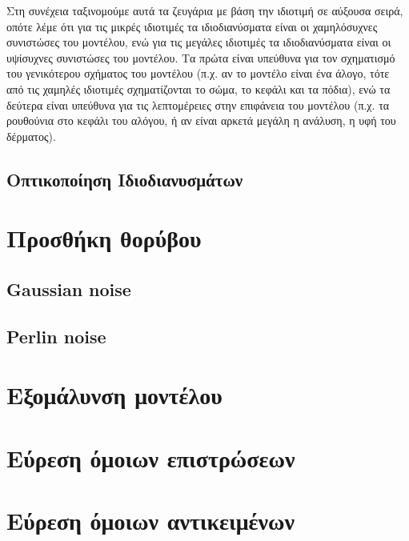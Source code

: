 \documentclass{article}
\begin{document}
Στη συνέχεια ταξινομούμε αυτά τα ζευγάρια με βάση την ιδιοτιμή σε αύξουσα σειρά,
οπότε λέμε ότι για τις μικρές ιδιοτιμές τα ιδιοδιανύσματα είναι οι χαμηλόσυχνες
συνιστώσες του μοντέλου,
ενώ για τις μεγάλες ιδιοτιμές τα ιδιοδιανύσματα είναι οι υψίσυχνες συνιστώσες του μοντέλου.
Τα πρώτα είναι υπεύθυνα για τον σχηματισμό του γενικότερου σχήματος του μοντέλου
(π.χ. αν το μοντέλο είναι ένα άλογο, τότε από τις χαμηλές ιδιοτιμές σχηματίζονται το
σώμα, το κεφάλι και τα πόδια), ενώ τα δεύτερα είναι υπεύθυνα για τις λεπτομέρειες στην
επιφάνεια του μοντέλου (π.χ. τα ρουθούνια στο κεφάλι του αλόγου,
ή αν είναι αρκετά μεγάλη η ανάλυση, η υφή του δέρματος).

\subsection{Οπτικοποίηση Ιδιοδιανυσμάτων}


\section{Προσθήκη θορύβου}

\subsection{Gaussian noise}

\subsection{Perlin noise}


\section{Εξομάλυνση μοντέλου}


\section{Εύρεση όμοιων επιστρώσεων}


\section{Εύρεση όμοιων αντικειμένων}

\end{document}
